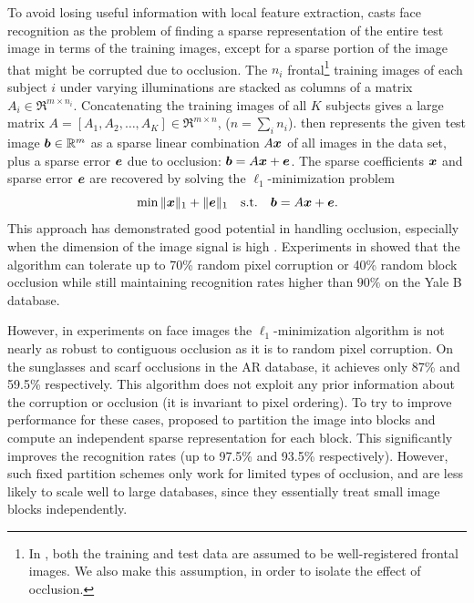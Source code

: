 To avoid losing useful information with local feature extraction,
\cite{Wright2009-PAMI} casts face recognition as the problem of finding a
sparse representation of the entire test image in terms of the training images,
except for a sparse portion of the image that might be corrupted due to
occlusion.  The $n_i$ frontal\footnote{In \cite{Wright2009-PAMI}, both the
training and test data are assumed to be well-registered frontal images. We
also make this assumption, in order to isolate the effect of occlusion.}
training images of each subject $i$ under varying illuminations are stacked as
columns of a matrix $A_i \in \Re^{m\times n_i}$. Concatenating the training
images of all $K$ subjects gives a large matrix $A = [A_1,A_2,\ldots,A_K] \in
\Re^{m\times n}$, ($n = \sum_i n_i$).  \cite{Wright2009-PAMI} then represents
the given test image $\boldsymbol{b} \in \mathbb R^m$ as a sparse linear combination $A {\boldsymbol{x}}$ of
all images in the data set, plus a sparse error $\boldsymbol{e}$ due to occlusion: $\boldsymbol{b} = A
{\boldsymbol{x}} + \boldsymbol{e}$. The sparse coefficients ${\boldsymbol{x}}$ and sparse error $\boldsymbol{e}$ are recovered by
solving the $\ell_1$-minimization problem
\begin{equation}
\min \|{\boldsymbol{x}}\|_1 + \|\boldsymbol{e}\|_1\quad \textup{s.t.} \quad \boldsymbol{b} = A {\boldsymbol{x}} + \boldsymbol{e}.
\end{equation}
This approach has demonstrated good potential in handling occlusion, especially
when the dimension of the image signal is high \cite{Wright2008-IT}.
Experiments in \cite{Wright2009-PAMI} showed that the algorithm can tolerate up
to 70\% random pixel corruption or 40\% random block occlusion while still
maintaining recognition rates higher than $90\%$ on the Yale B database.

However, in experiments on face images the $\ell_1$-minimization algorithm is
not nearly as robust to contiguous occlusion as it is to random pixel
corruption.  On the sunglasses and scarf occlusions in the AR database, it achieves
only 87\% and 59.5\% respectively.  This algorithm does not exploit any prior
information about the corruption or occlusion (it is invariant to pixel
ordering).  To try to improve performance for these cases,
\cite{Wright2009-PAMI} proposed to partition the image into blocks and compute
an independent sparse representation for each block. This significantly
improves the recognition rates (up to 97.5\% and 93.5\% respectively). However,
such fixed partition schemes only work for limited types of occlusion, and are
less likely to scale well to large databases, since they essentially treat
small image blocks independently.

